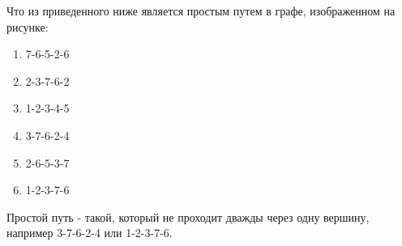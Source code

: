
Что из приведенного ниже является простым путем в графе, изображенном на рисунке:


\begin{enumerate}
    \item 7-6-5-2-6
    \item 2-3-7-6-2
    \item 1-2-3-4-5
    \item 3-7-6-2-4
    \item 2-6-5-3-7
    \item 1-2-3-7-6
\end{enumerate}

\explanationSection

Простой путь - такой, который не проходит дважды через одну вершину, например 3-7-6-2-4 или 1-2-3-7-6.

